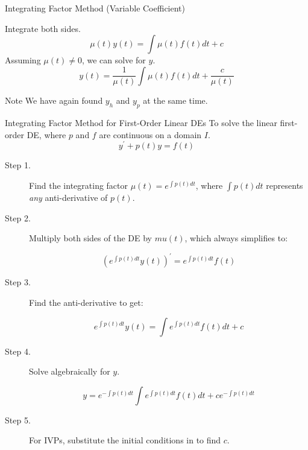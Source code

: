 \documentclass{beamer}
\begin{document}
\begin{frame}
\begin{block}{Integrating Factor Method (Variable Coefficient)}
\begin{overprint}
\begin{equation*}
\end{equation*}
Integrate both sides.
\begin{equation*}
\mu(t) y(t) = \int \mu(t) f(t) dt + c
\end{equation*}
Assuming $\mu(t)\neq 0$, we can solve for $y$.
\begin{equation*}
y(t) = \dfrac{1}{\mu(t)} \int \mu(t) f(t) dt + \dfrac{c}{\mu(t)}
\end{equation*}
\end{overprint}
\end{block}
\begin{block}{Note}
We have again found $y_h$ and $y_p$ at the same time.
\end{block}
\end{frame}

\begin{frame}
\begin{block}{Integrating Factor Method for First-Order Linear DEs}
\small
To solve the linear first-order DE, where $p$ and $f$ are continuous on a domain $I$.
\begin{equation*}
y^\prime + p(t) y = f(t)
\end{equation*}
\begin{description}
\item[Step 1.] Find the integrating factor $\mu(t) = e^{\int p(t) dt}$, where $\int p(t) dt$ represents \emph{any} anti-derivative of $p(t)$.
\item[Step 2.] Multiply both sides of the DE by $mu(t)$, which always simplifies to:

\vspace{-2mm}
\begin{equation*}
{\left(e^{\int p(t) dt} y(t)\right)}^\prime = e^{\int p(t) dt} f(t)
\end{equation*}
\item[Step 3.] Find the anti-derivative to get:

\vspace{-2mm}
\begin{equation*}
e^{\int p(t) dt} y(t) = \int e^{\int p(t) dt} f(t) dt +c
\end{equation*}
\item[Step 4.] Solve algebraically for $y$.

\vspace{-2mm}
\begin{equation*}
y = e^{-\int p(t) dt} \int e^{\int p(t) dt} f(t) dt + c e^{-\int p(t) dt}
\end{equation*}
\item[Step 5.] For IVPs, substitute the initial conditions in to find $c$.
\end{description}
\end{block}
\end{frame}
\end{document}
